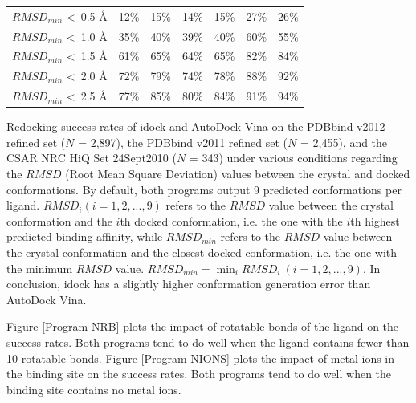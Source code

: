 \begin{table}[!ht]
\begin{tabular}{lrrrrrr}
\noalign{\smallskip}
$RMSD_{min}$ \textless\ 0.5 \AA & 12\% & 15\% & 14\% & 15\% & 27\% & 26\%\\
$RMSD_{min}$ \textless\ 1.0 \AA & 35\% & 40\% & 39\% & 40\% & 60\% & 55\%\\
$RMSD_{min}$ \textless\ 1.5 \AA & 61\% & 65\% & 64\% & 65\% & 82\% & 84\%\\
$RMSD_{min}$ \textless\ 2.0 \AA & 72\% & 79\% & 74\% & 78\% & 88\% & 92\%\\
$RMSD_{min}$ \textless\ 2.5 \AA & 77\% & 85\% & 80\% & 84\% & 91\% & 94\%\\
\end{tabular}
\begin{flushleft}\label{SuccessRate} Redocking success rates of idock and AutoDock Vina on the PDBbind v2012 refined set ($N$ = 2,897), the PDBbind v2011 refined set ($N$ = 2,455), and the CSAR NRC HiQ Set 24Sept2010 ($N$ = 343) under various conditions regarding the $RMSD$ (Root Mean Square Deviation) values between the crystal and docked conformations. By default, both programs output 9 predicted conformations per ligand. $RMSD_i (i = 1,2,...,9)$ refers to the $RMSD$ value between the crystal conformation and the $i$th docked conformation, i.e. the one with the $i$th highest predicted binding affinity, while $RMSD_{min}$ refers to the $RMSD$ value between the crystal conformation and the closest docked conformation, i.e. the one with the minimum $RMSD$ value. $RMSD_{min} = \displaystyle\min_{i}RMSD_i\ (i = 1,2,...,9)$. In conclusion, idock has a slightly higher conformation generation error than AutoDock Vina.
\end{flushleft}
\end{table}

Figure \ref{Program-NRB} plots the impact of rotatable bonds of the ligand on the success rates. Both programs tend to do well when the ligand contains fewer than 10 rotatable bonds. Figure \ref{Program-NIONS} plots the impact of metal ions in the binding site on the success rates. Both programs tend to do well when the binding site contains no metal ions.

